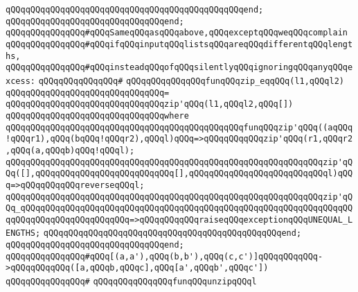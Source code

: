 \verb|qQQqqQQqqQQqqQQqqQQqqQQqqQQqqQQqqQQqqQQqqQQqqQQqend;|\newline
\verb|qQQqqQQqqQQqqQQqqQQqqQQqqQQqqQQqend;|\newline
\newline
\newline
\newline
\verb|qQQqqQQqqQQqqQQq#qQQqSameqQQqasqQQqabove,qQQqexceptqQQqweqQQqcomplain|\newline
\verb|qQQqqQQqqQQqqQQq#qQQqifqQQqinputqQQqlistsqQQqareqQQqdifferentqQQqlengths,|\newline
\verb|qQQqqQQqqQQqqQQq#qQQqinsteadqQQqofqQQqsilentlyqQQqignoringqQQqanyqQQqexcess:|\newline
\verb|qQQqqQQqqQQqqQQq#|\newline
\verb|qQQqqQQqqQQqqQQqfunqQQqzip_eqqQQq(l1,qQQql2)|\newline
\verb|qQQqqQQqqQQqqQQqqQQqqQQqqQQqqQQq=|\newline
\verb|qQQqqQQqqQQqqQQqqQQqqQQqqQQqqQQqzip'qQQq(l1,qQQql2,qQQq[])|\newline
\verb|qQQqqQQqqQQqqQQqqQQqqQQqqQQqqQQqwhere|\newline
\verb|qQQqqQQqqQQqqQQqqQQqqQQqqQQqqQQqqQQqqQQqqQQqqQQqfunqQQqzip'qQQq((aqQQq!qQQqr1),qQQq(bqQQq!qQQqr2),qQQql)qQQq=>qQQqqQQqqQQqzip'qQQq(r1,qQQqr2,qQQq(a,qQQqb)qQQq!qQQql);|\newline
\verb|qQQqqQQqqQQqqQQqqQQqqQQqqQQqqQQqqQQqqQQqqQQqqQQqqQQqqQQqqQQqqQQqzip'qQQq([],qQQqqQQqqQQqqQQqqQQqqQQqqQQq[],qQQqqQQqqQQqqQQqqQQqqQQqqQQql)qQQq=>qQQqqQQqqQQqreverseqQQql;|\newline
\verb|qQQqqQQqqQQqqQQqqQQqqQQqqQQqqQQqqQQqqQQqqQQqqQQqqQQqqQQqqQQqqQQqzip'qQQq_qQQqqQQqqQQqqQQqqQQqqQQqqQQqqQQqqQQqqQQqqQQqqQQqqQQqqQQqqQQqqQQqqQQqqQQqqQQqqQQqqQQqqQQqqQQq=>qQQqqQQqqQQqraiseqQQqexceptionqQQqUNEQUAL_LENGTHS;|\newline
\verb|qQQqqQQqqQQqqQQqqQQqqQQqqQQqqQQqqQQqqQQqqQQqqQQqend;|\newline
\verb|qQQqqQQqqQQqqQQqqQQqqQQqqQQqqQQqend;|\newline
\newline
\newline
\newline
\verb|qQQqqQQqqQQqqQQq#qQQq[(a,a'),qQQq(b,b'),qQQq(c,c')]qQQqqQQqqQQq->qQQqqQQqqQQq([a,qQQqb,qQQqc],qQQq[a',qQQqb',qQQqc'])|\newline
\verb|qQQqqQQqqQQqqQQq#|\newline
\verb|qQQqqQQqqQQqqQQqfunqQQqunzipqQQql|\newline
